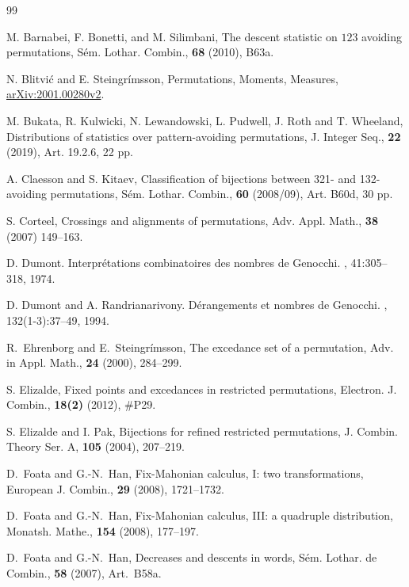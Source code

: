 \documentclass[12pt]{amsart}
\numberwithin{equation}{section}
\theoremstyle{plain}
\theoremstyle{definition}
\begin{document}
\begin{thebibliography}{99} 

 M. Barnabei, F. Bonetti, and M. Silimbani, The descent statistic on $123$ avoiding permutations, S\'em. Lothar. Combin., {\bf68} (2010), B63a.

 N. Blitvi\'c and E. Steingr\'imsson, Permutations, Moments, Measures, \href{https://arxiv.org/abs/2001.00280}{arXiv:2001.00280v2}.

 M. Bukata, R.  Kulwicki, N. Lewandowski, L. Pudwell, J. Roth and T. Wheeland, Distributions of statistics over pattern-avoiding permutations, J. Integer Seq., {\bf22} (2019), Art. 19.2.6, 22 pp.

  A. Claesson and S. Kitaev,  Classification of bijections between 321- and 132-avoiding permutations, S\'em. Lothar. Combin., {\bf60} (2008/09), Art. B60d, 30 pp.

 S. Corteel, Crossings and alignments of permutations, Adv. Appl. Math., {\bf38} (2007) 149--163.

D. Dumont.
\newblock Interpr\'{e}tations combinatoires des nombres de {G}enocchi.
, 41:305--318, 1974.

D. Dumont and A. Randrianarivony.
\newblock D\'{e}rangements et nombres de {G}enocchi.
, 132(1-3):37--49, 1994.

 R.~Ehrenborg and E.~Steingr\'imsson, The excedance set of a permutation, Adv. in Appl. Math., {\bf24} (2000), 284--299.


 S. Elizalde, Fixed points and excedances in restricted permutations, Electron. J. Combin., {\bf18(2)} (2012), \#P29.

 S. Elizalde and I. Pak, Bijections for refined restricted permutations, 
J. Combin. Theory Ser. A, {\bf105} (2004), 207--219. 



 D.~Foata and G.-N.~Han, Fix-Mahonian calculus, I: two transformations, European J. Combin., {\bf 29} (2008), 1721--1732. 

 D.~Foata and G.-N.~Han, Fix-Mahonian calculus, III: a quadruple distribution, Monatsh. Mathe., {\bf 154} (2008), 177--197. 

 D.~Foata and G.-N.~Han, Decreases and descents in words, S\'em. Lothar. de Combin., {\bf 58} (2007), Art.~B58a.


\end{thebibliography}
\end{document}
